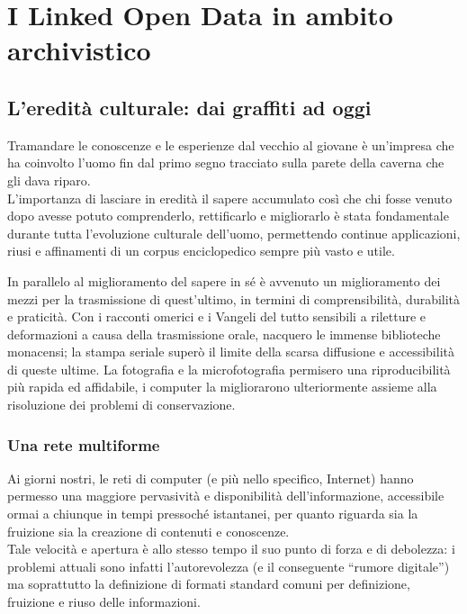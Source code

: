 \chapter{I Linked Open Data in ambito archivistico}

\section{L'eredità culturale: dai graffiti ad oggi}

Tramandare le conoscenze e le esperienze dal vecchio al giovane è un'impresa che ha coinvolto l'uomo fin dal primo segno tracciato sulla parete della caverna che gli dava riparo.\\
L'importanza di lasciare in eredità il sapere accumulato così che chi fosse venuto dopo avesse potuto comprenderlo, rettificarlo e migliorarlo è stata fondamentale durante tutta l'evoluzione culturale dell'uomo, permettendo continue applicazioni, riusi e affinamenti di un corpus enciclopedico sempre più vasto e utile.

In parallelo al miglioramento del sapere in sé è avvenuto un miglioramento dei mezzi per la trasmissione di quest'ultimo, in termini di comprensibilità, durabilità e praticità. Con i racconti omerici e i Vangeli del tutto sensibili a riletture e deformazioni a causa della trasmissione orale, nacquero le immense biblioteche monacensi; la stampa seriale superò il limite della scarsa diffusione e accessibilità di queste ultime. La fotografia e la microfotografia permisero una riproducibilità più rapida ed affidabile, i computer la migliorarono ulteriormente assieme alla risoluzione dei problemi di conservazione.

\subsection{Una rete multiforme}
Ai giorni nostri, le reti di computer (e più nello specifico, Internet) hanno permesso una maggiore pervasività e disponibilità dell'informazione, accessibile ormai a chiunque in tempi pressoché istantanei, per quanto riguarda sia la fruizione sia la creazione di contenuti e conoscenze.\\
Tale velocità e apertura è allo stesso tempo il suo punto di forza e di debolezza: i problemi attuali sono infatti l'autorevolezza (e il conseguente ``rumore digitale'') ma soprattutto la definizione di formati standard comuni per definizione, fruizione e riuso delle informazioni.

